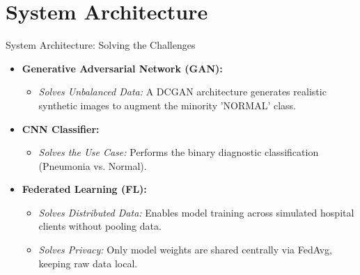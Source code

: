\documentclass[aspectratio=169]{iticslides}
\begin{document}
\section{System Architecture}

\begin{frame}{System Architecture: Solving the Challenges}
  \begin{itemize}
  \item \textbf{Generative Adversarial Network (GAN):}
    \begin{itemize}
    \item \textit{Solves Unbalanced Data:} A DCGAN architecture
      generates realistic synthetic images to augment the minority
      'NORMAL' class.
    \end{itemize}
    \vspace{0.3cm}
  \item \textbf{CNN Classifier:}
    \begin{itemize}
    \item \textit{Solves the Use Case:} Performs the binary
      diagnostic classification (Pneumonia vs. Normal).
    \end{itemize}

    \vspace{0.3cm}

  \item \textbf{Federated Learning (FL):}
    \begin{itemize}
    \item \textit{Solves Distributed Data:} Enables model training
      across simulated hospital clients without pooling data.
      
    \item \textit{Solves Privacy:} Only model weights are shared
      centrally via FedAvg, keeping raw data local.
      
    \end{itemize}
  \end{itemize}
\end{frame}
\end{document}
